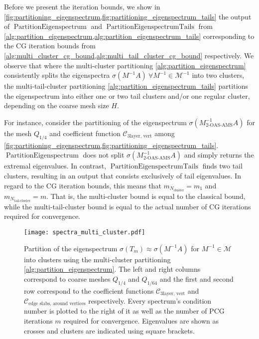 Before we present the iteration bounds, we show in \cref{fig:partitioning_eigenspectrum,fig:partitioning_eigenspectrum_tails} the output of \newline$\operatorname{PartitionEigenspectrum}$ and $\operatorname{PartitionEigenspectrumTails}$ from \cref{alg:partition_eigenspectrum,alg:partition_eigenspectrum_tails} corresponding to the CG iteration bounds from \cref{alg:multi_cluster_cg_bound,alg:multi_tail_cluster_cg_bound} respectively. We observe that where the multi-cluster partitioning \cref{alg:partition_eigenspectrum} consistently splits the eigenspectra $\sigma(M^{-1}A) \ \forall M^{-1} \in\mathcal{M}^{-1}$ into two clusters, the multi-tail-cluster partitioning  \cref{alg:partition_eigenspectrum_tails} partitions the eigenspectrum into either one or two tail clusters and/or one regular cluster, depending on the coarse mesh size $H$.

For instance, consider the partitioning of the eigenspectrum $\sigma(M_{\text{2-OAS-AMS}}^{-1}A)$ for the mesh $Q_{1/4}$ and coefficient function $\mathcal{C}_{\text{3layer, vert}}$ among \cref{fig:partitioning_eigenspectrum,fig:partitioning_eigenspectrum_tails}. $\operatorname{PartitionEigenspectrum}$ does not split $\sigma(M_{\text{2-OAS-AMS}}^{-1}A)$ and simply returns the extremal eigenvalues. In contrast, $\operatorname{PartitionEigenspectrumTails}$ finds two tail clusters, resulting in an output that consists exclusively of tail eigenvalues. In regard to the CG iteration bounds, this means that $m_{N_{\text{cluster}}} = m_1$ and $m_{N_{\text{tail-cluster}}} = m$. That is, the multi-cluster bound is equal to the classical bound, while the multi-tail-cluster bound is equal to the actual number of CG iterations required for convergence.
\begin{figure}[H]
    \centering
    \texttt{[image: spectra\_multi\_cluster.pdf]}
    \caption{Partition of the eigenspectrum $\sigma(T_m)\approx\sigma(M^{-1}A)$ for $M^{-1}\in\mathcal{M}$ into clusters using the multi-cluster partitioning \cref{alg:partition_eigenspectrum}. The left and right columns correspond to coarse meshes $Q_{1/4}$ and $Q_{1/64}$ and the first and second row correspond to the coefficient functions $\mathcal{C}_{\text{3layer, vert}}$ and $\mathcal{C}_{\text{edge slabs, around vertices}}$ respectively. Every spectrum's condition number is plotted to the right of it as well as the number of PCG iterations $m$ required for convergence. Eigenvalues are shown as crosses and clusters are indicated using square brackets.}
    \label{fig:partitioning_eigenspectrum}
\end{figure}

